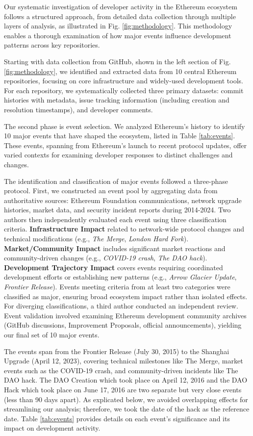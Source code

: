 Our systematic investigation of developer activity in the Ethereum ecosystem follows a structured approach, from detailed data collection through multiple layers of analysis, as illustrated in Fig. \ref{fig:methodology}. This methodology enables a thorough examination of how major events influence development patterns across key repositories.

Starting with data collection from GitHub, shown in the left section of Fig. \ref{fig:methodology},  we identified and extracted data from 10 central Ethereum repositories, focusing on core infrastructure and widely-used development tools. For each repository, we systematically collected three primary datasets: commit histories with metadata, issue tracking information (including creation and resolution timestamps), and developer comments.

The second phase is event selection. We analyzed Ethereum’s history to identify 10 major events that have shaped the ecosystem, listed in Table \ref{tab:events}. These events, spanning from Ethereum’s launch to recent protocol updates, offer varied contexts for examining developer responses to distinct challenges and changes.

The identification and classification of major events followed a three-phase protocol. First, we constructed an event pool by aggregating data from authoritative sources: Ethereum Foundation communications, network upgrade histories, market data, and security incident reports during 2014-2024. Two authors then independently evaluated each event using three classification criteria. \textbf{Infrastructure Impact} related to network-wide protocol changes and technical modifications (e.g., \textit{The Merge}, \textit{London Hard Fork}). \textbf{Market/Community Impact} includes significant market reactions and community-driven changes (e.g., \textit{COVID-19 crash}, \textit{The DAO hack}). \textbf{Development Trajectory Impact} covers events requiring coordinated development efforts or establishing new patterns (e.g., \textit{Arrow Glacier Update}, \textit{Frontier Release}). Events meeting criteria from at least two categories were classified as major, ensuring broad ecosystem impact rather than isolated effects. For diverging classifications, a third author conducted an independent review. Event validation involved examining Ethereum development community archives (GitHub discussions, Improvement Proposals, official announcements), yielding our final set of 10 major events.

The events span from the Frontier Release (July 30, 2015) to the Shanghai Upgrade (April 12, 2023), covering technical milestones like The Merge, market events such as the COVID-19 crash, and community-driven incidents like The DAO hack. The DAO Creation which took place on April 12, 2016 and the DAO Hack which took place on June 17, 2016 are two separate but very close events (less than 90 days apart). As explicated below, we avoided overlapping effects for streamlining our analysis; therefore, we took the date of the hack as the reference date. Table \ref{tab:events} provides details on each event’s significance and its impact on development activity.

